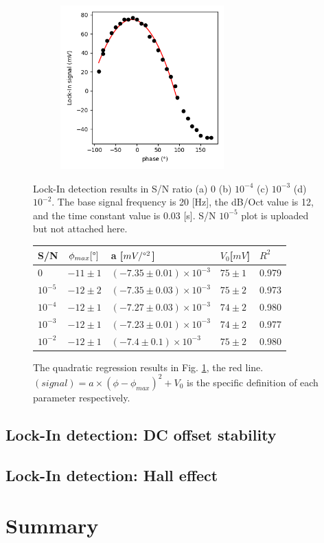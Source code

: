 \documentclass{article}
\begin{document}
\begin{figure}[H]
\hfill
\begin{subfigure}[b]{6.3cm}
  \centering
  \includegraphics[width=6.3cm]{../results/lock_In_phase_plot(Noise10^-2).png}
  \caption{}
\end{subfigure}
\hfill
  \caption{Lock-In detection results in S/N ratio (a) 0 (b) $10^{-4}$ (c) $10^{-3}$ (d) $10^{-2}$.
    The base signal frequency is 20 [Hz], the dB/Oct value is 12, and the time constant value is 0.03 [s].
    S/N $10^{-5}$ plot is uploaded but not attached here.
   }
  \label{fig: lock_in_phase_plot}
\end{figure}

\begin{figure}[H]
  \centering
  \begin{tabular}{  m{1.5cm} | m{2cm} | m{5cm} | m{3cm} | m{1cm}  } 

    S/N & $\phi_{max} [\degree]$ & a [$mV/\degree^2$]& $V_0$[$mV$] & $R^2$\\ \hline
      0 & $-11 \pm 1$  & $(-7.35 \pm 0.01)\times 10^{-3}$ & $75 \pm 1$ & 0.979 \\ \hline
      $10^{-5}$ & $-12 \pm 2$& $(-7.35 \pm 0.03) \times 10^{-3}$ & $75 \pm 2$ & 0.973\\ \hline
      $10^{-4}$ & $-12 \pm 1$& $(-7.27 \pm 0.03) \times 10^{-3}$ & $74 \pm 2 $& 0.980 \\ \hline
      $10^{-3}$ & $-12 \pm 1$ & $(-7.23 \pm 0.01) \times 10^{-3} $& $74 \pm 2$ & 0.977 \\ \hline
      $10^{-2}$ & $-12 \pm 1$ & $(-7.4 \pm 0.1) \times 10^{-3}$ & $75 \pm 2$ & 0.980 \\ 
    
  \end{tabular}
  \caption{
    The quadratic regression results in Fig. \ref{fig: lock_in_phase_plot}, the red line.
    $(signal) = a \times (\phi - \phi_{max})^2  + V_0$ is the specific definition of each parameter respectively.
  }
  \label{fig: lock_in_phase_statics}
\end{figure}



\subsection{Lock-In detection: DC offset stability}



\subsection{Lock-In detection: Hall effect}



\section{Summary}

\cite{abcd}


\end{document}
